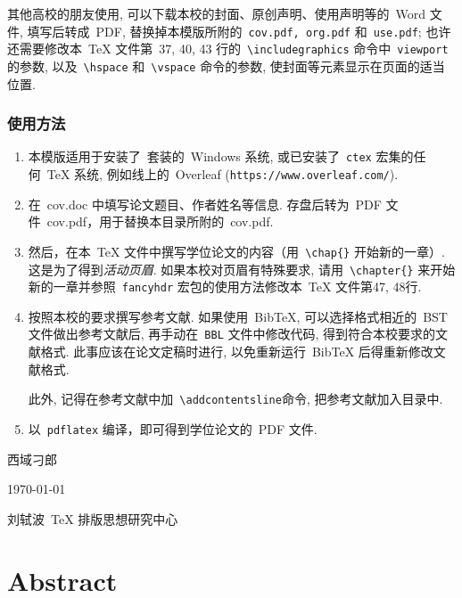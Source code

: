 \documentclass[12pt]{ctexbook}
\newcommand{\chap}[1]{\chapter{#1}\fancyhead[CE]{第\CJKnumber{\thechapter}章\quad
#1}\fancyhead[CO]{\S\rightmark}}
\theoremstyle{definition}
\theoremstyle{remark}
\begin{document}
其他高校的朋友使用, 可以下载本校的封面、原创声明、使用声明等的~Word 文件, 填写后转成~PDF, 替换掉本模版所附的~\texttt{cov.pdf, org.pdf} 和~\verb|use.pdf|; 也许还需要修改本~\TeX{} 文件第~37, 40, 43 行的~\verb|\includegraphics| 命令中~\verb|viewport| 的参数, 以及~\verb|\hspace| 和~\verb|\vspace| 命令的参数, 使封面等元素显示在页面的适当位置.

\subsection*{使用方法}
\begin{enumerate}
\item 本模版适用于安装了~\CTeX 套装的~Windows 系统, 或已安装了~\verb|ctex| 宏集的任何~\TeX{} 系统, 例如线上的~Overleaf ({\color{blue}\verb|https://www.overleaf.com/|}).
\item 在~cov.doc 中填写论文题目、作者姓名等信息. 存盘后转为~PDF 文件~cov.pdf，用于替换本目录所附的~cov.pdf.
\item 然后，在本~\TeX{} 文件中撰写学位论文的内容（用~\verb|\chap{}| 开始新的一章）. 这是为了得到\emph{活动页眉}. 如果本校对页眉有特殊要求, 请用~\verb|\chapter{}| 来开始新的一章并参照~\verb|fancyhdr| 宏包的使用方法修改本~\TeX{} 文件第47, 48行.
\item 按照本校的要求撰写参考文献. 如果使用~BibTeX, 可以选择格式相近的~BST 文件做出参考文献后, 再手动在~\verb|BBL| 文件中修改代码, 得到符合本校要求的文献格式. 此事应该在论文定稿时进行, 以免重新运行~BibTeX 后得重新修改文献格式.

此外, 记得在参考文献中加~\verb|\addcontentsline|命令, 把参考文献加入目录中.
\item 以~\verb|pdflatex| 编译，即可得到学位论文的~PDF 文件.
\end{enumerate}

\hfill 西域刁郎\hspace{17mm}

\hfill \today

\hfill 刘轼波~\TeX{} 排版思想研究中心

\hfill\texttt{\color{blue}{lausb4@gmail.com}}

\chapter*{Abstract}
\end{document}
